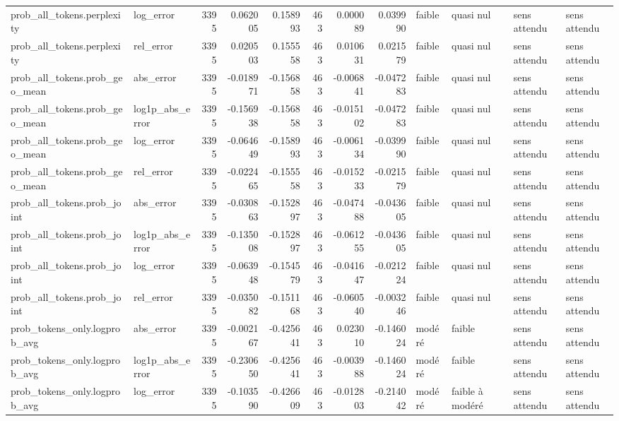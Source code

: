 \begin{longtable}{llrrrrrrllll}
prob\_all\_tokens.perplexity & log\_error & 3395 & 0.062005 & 0.158993 & 463 & 0.000089 & 0.039990 & faible & quasi nul & sens attendu & sens attendu \\
prob\_all\_tokens.perplexity & rel\_error & 3395 & 0.020503 & 0.155558 & 463 & 0.010631 & 0.021579 & faible & quasi nul & sens attendu & sens attendu \\
prob\_all\_tokens.prob\_geo\_mean & abs\_error & 3395 & -0.018971 & -0.156858 & 463 & -0.006841 & -0.047283 & faible & quasi nul & sens attendu & sens attendu \\
prob\_all\_tokens.prob\_geo\_mean & log1p\_abs\_error & 3395 & -0.156938 & -0.156858 & 463 & -0.015102 & -0.047283 & faible & quasi nul & sens attendu & sens attendu \\
prob\_all\_tokens.prob\_geo\_mean & log\_error & 3395 & -0.064649 & -0.158993 & 463 & -0.006134 & -0.039990 & faible & quasi nul & sens attendu & sens attendu \\
prob\_all\_tokens.prob\_geo\_mean & rel\_error & 3395 & -0.022465 & -0.155558 & 463 & -0.015233 & -0.021579 & faible & quasi nul & sens attendu & sens attendu \\
prob\_all\_tokens.prob\_joint & abs\_error & 3395 & -0.030863 & -0.152897 & 463 & -0.047488 & -0.043605 & faible & quasi nul & sens attendu & sens attendu \\
prob\_all\_tokens.prob\_joint & log1p\_abs\_error & 3395 & -0.135008 & -0.152897 & 463 & -0.061255 & -0.043605 & faible & quasi nul & sens attendu & sens attendu \\
prob\_all\_tokens.prob\_joint & log\_error & 3395 & -0.063948 & -0.154579 & 463 & -0.041647 & -0.021224 & faible & quasi nul & sens attendu & sens attendu \\
prob\_all\_tokens.prob\_joint & rel\_error & 3395 & -0.035082 & -0.151168 & 463 & -0.060540 & -0.003246 & faible & quasi nul & sens attendu & sens attendu \\
prob\_tokens\_only.logprob\_avg & abs\_error & 3395 & -0.002167 & -0.425641 & 463 & 0.023010 & -0.146024 & modéré & faible & sens attendu & sens attendu \\
prob\_tokens\_only.logprob\_avg & log1p\_abs\_error & 3395 & -0.230650 & -0.425641 & 463 & -0.003988 & -0.146024 & modéré & faible & sens attendu & sens attendu \\
prob\_tokens\_only.logprob\_avg & log\_error & 3395 & -0.103590 & -0.426609 & 463 & -0.012803 & -0.214042 & modéré & faible à modéré & sens attendu & sens attendu \\

\end{longtable}
